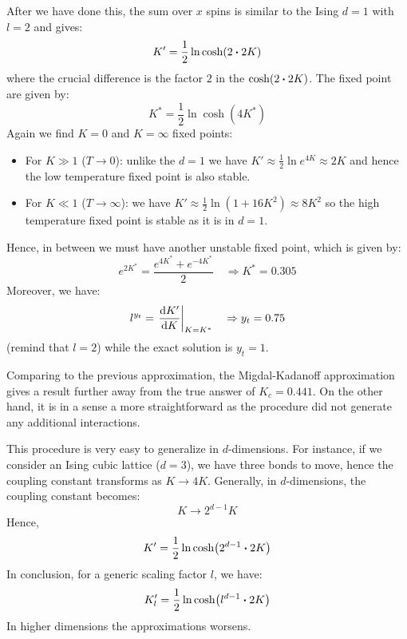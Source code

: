 \documentclass[../main/main.tex]{subfiles}
\begin{document}
After we have done this, the sum over \( x \) spins is similar to the Ising \( d=1 \) with \( l=2 \) and gives:
\begin{equation*}
  K' = \frac{1}{2} \ln \cosh (2 \vdot 2K)
\end{equation*}
where the crucial difference is the factor \( 2 \) in the \(\cosh (2 \vdot 2K)  \).
 The fixed point are given by:
\begin{equation*}
  K^* = \frac{1}{2} \ln \cosh (4 K^*)
\end{equation*}
Again we find \( K=0 \) and \( K= \infty  \)  fixed points:
\begin{itemize}
\item For \( K \gg 1 \) (\( T \rightarrow 0 \)):  unlike the \( d=1 \) we have \( K' \approx \frac{1}{2} \ln e^{4K} \approx 2K \) and hence the low temperature fixed point is also stable.
\item For \( K \ll 1 \) (\( T \rightarrow \infty  \)): we have \( K' \approx \frac{1}{2} \ln (1+16K^2) \approx 8K^2 \) so the high temperature fixed point is stable as it is in \( d=1 \).
\end{itemize}
Hence, in between we must have another unstable fixed point, which is given by:
\begin{equation*}
  e^{2K^*} = \frac{e^{4K^*} + e^{-4K^*}}{2} \quad \Rightarrow K^* = 0.305
\end{equation*}
Moreover, we have:
\begin{equation*}
  l^{y_t} = \eval{\dv{K'}{K} }_{K=K^*} \quad \Rightarrow y_t = 0.75
\end{equation*}
(remind that \( l=2 \)) while the exact solution is \( y_t = 1 \).

Comparing to the previous approximation, the Migdal-Kadanoff approximation gives a result further away from the true answer of \( K_c = 0.441 \). On the other hand, it is in a sense a more straightforward as the procedure did not generate any additional interactions.

This procedure is very easy to generalize in \( d \)-dimensions. For instance, if we consider an Ising cubic lattice (\( d=3 \)), we have three bonds to move, hence the coupling constant transforms as \( K \rightarrow 4K \). Generally, in \( d \)-dimensions, the coupling constant becomes:
\begin{equation*}
  K \rightarrow 2^{d-1}  K
\end{equation*}
Hence,
\begin{equation}
  K' = \frac{1}{2} \ln \cosh(2^{d-1} \vdot 2K)
\end{equation}
In conclusion, for a generic scaling factor \( l \), we have:
\begin{equation}
  K_l' = \frac{1}{2} \ln \cosh(l^{d-1} \vdot 2K)
\end{equation}
In higher dimensions the approximations worsens.
\end{document}

